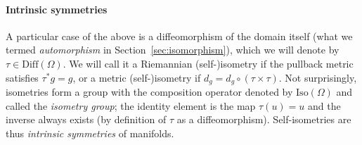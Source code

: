 

\paragraph{Intrinsic symmetries}
A particular case of the above is a diffeomorphism  of the domain itself (what we termed {\em automorphism} in Section~\ref{sec:isomorphism}), which we will denote by $\tau \in \mathrm{Diff}(\Omega)$. We will call it a Riemannian  \mbox{(self-)isometry} if the pullback metric satisfies $\tau^* g = g$, or a metric (self-)isometry if $d_g = d_g\circ (\tau \times \tau)$.
%
Not surprisingly, isometries form a group with the composition operator denoted by $\mathrm{Iso}(\Omega)$ and called the {\em isometry group}; the identity element is the map $\tau(u) = u$ and the inverse always exists (by definition of $\tau$ as a diffeomorphism). 
%
Self-isometries are thus {\em intrinsic symmetries} of manifolds.






